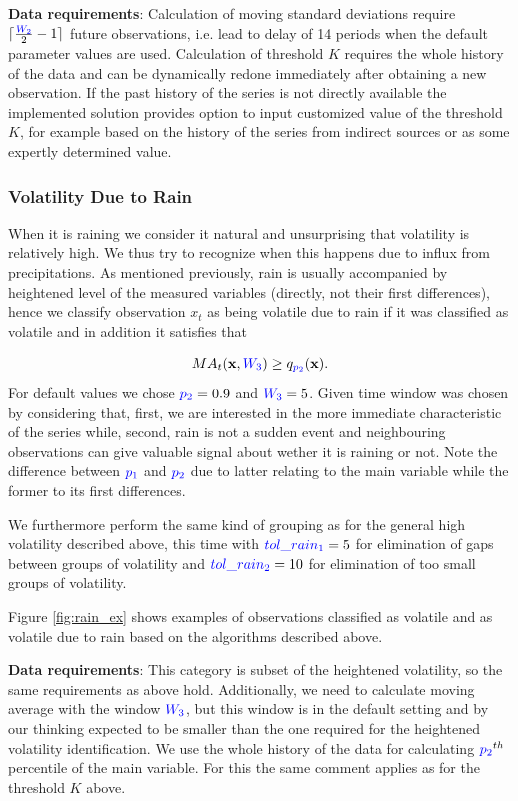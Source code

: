 \documentclass[12pt,a4paper]{article}
\begin{document}
\textbf{Data requirements}: Calculation of moving standard deviations require $\lceil \frac{\textcolor{blue}{W_2}}{2}-1 \rceil$ future observations, i.e. lead to delay of 14 periods when  the default parameter values are used. Calculation of threshold $K$ requires the whole history of the data and can be dynamically redone immediately after obtaining a new observation. If the past history of the series is not directly available the implemented solution provides option to input customized value of the threshold $K$, for example based on the history of the series from indirect sources or as some expertly determined value.

\subsubsection{Volatility Due to Rain}
When it is raining we consider it natural and unsurprising that volatility is relatively high. We thus try to recognize when this happens due to influx from precipitations. As mentioned previously, rain is usually accompanied by heightened level of the measured variables (directly, not their first differences), hence we classify observation $x_t$ as being volatile due to rain if it was classified as volatile and in addition it satisfies that 

$$    MA_t(\mathbf{x},\textcolor{blue}{W_3}) \geq q_{\textcolor{blue}{p_2}}(\mathbf{x}).  $$
For default values we chose $\textcolor{blue}{p_2} = 0.9$ and $\textcolor{blue}{W_3} = 5$. Given time window was chosen by considering that, first, we are interested in the more immediate characteristic of the series while, second, rain is not a sudden event and neighbouring observations can give valuable signal about wether it is raining or not. Note the difference between $\textcolor{blue}{p_1}$ and $\textcolor{blue}{p_2}$ due to latter relating to the main variable while the former to its first differences.

We furthermore perform the same kind of grouping as for the general high volatility described above, this time with $\textcolor{blue}{tol\_rain_1} = 5$ for elimination of gaps between groups of volatility and $\textcolor{blue}{tol\_rain_2} = 10$ for elimination of too small groups of volatility.

Figure \ref{fig:rain_ex} shows examples of observations classified as volatile and as volatile due to rain based on the algorithms described above.

\textbf{Data requirements}: This category is subset of the heightened volatility, so the same requirements as above hold. Additionally, we need to calculate moving average with the window $\textcolor{blue}{W_3}$, but this window is in the default setting and by our thinking expected to be smaller than the one required for the heightened volatility identification. We use the whole history of the data for calculating $\textcolor{blue}{p_2}^{th}$ percentile of the main variable. For this the same comment applies as for the threshold $K$ above. 
\end{document}
